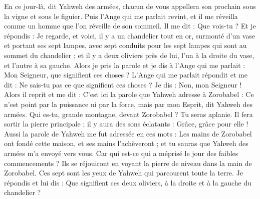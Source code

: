 \begin{multicols}{2}
En ce jour-là, dit Yahweh des armées, chacun de vous appellera son prochain sous la vigne et sous le figuier.
\VerseOne{}Puis l'Ange qui me parlait revint, et il me réveilla comme un homme que l'on réveille de son sommeil.
Il me dit : Que vois-tu ? Et je répondis : Je regarde, et voici, il y a un chandelier tout en or, surmonté d'un vase et portant ses sept lampes, avec sept conduits pour les sept lampes qui sont au sommet du chandelier ;
et il y a deux oliviers près de lui, l'un à la droite du vase, et l'autre à sa gauche.
Alors je pris la parole et je dis à l'Ange qui me parlait : Mon Seigneur, que signifient ces choses ?
L'Ange qui me parlait répondit et me dit : Ne sais-tu pas ce que signifient ces choses ? Je dis : Non, mon Seigneur !
Alors il reprit et me dit : C'est ici la parole que Yahweh adresse à Zorobabel : Ce n'est point par la puissance ni par la force, mais par mon Esprit, dit Yahweh des armées.
Qui es-tu, grande montagne, devant Zorobabel ? Tu seras aplanie. Il fera sortir la pierre principale ; il y aura des sons éclatants : Grâce, grâce pour elle !
Aussi la parole de Yahweh me fut adressée en ces mots :
Les mains de Zorobabel ont fondé cette maison, et ses mains l'achèveront ; et tu sauras que Yahweh des armées m'a envoyé vers vous.
Car qui est-ce qui a méprisé le jour des faibles commencements ? Ils se réjouiront en voyant la pierre de niveau dans la main de Zorobabel. Ces sept sont les yeux de Yahweh qui parcourent toute la terre.
Je répondis et lui dis : Que signifient ces deux oliviers, à la droite et à la gauche du chandelier ?

\end{multicols}
